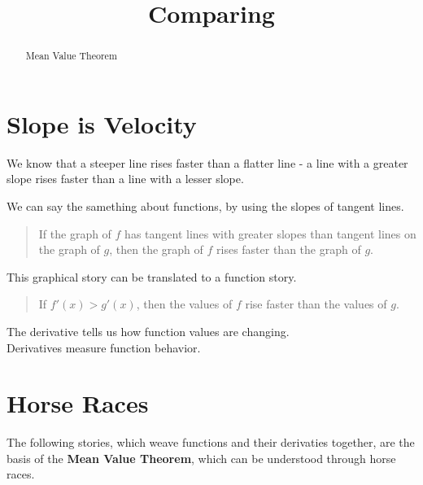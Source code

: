 \documentclass{ximera}
\title{Comparing}
\begin{document}
\begin{abstract}
Mean Value Theorem
\end{abstract}
\maketitle






\section{Slope is Velocity}



We know that a steeper line rises faster than a flatter line - a line with a greater slope rises faster than a line with a lesser slope. 


We can say the samething about functions, by using the slopes of tangent lines.


\begin{quote}

If the graph of $f$ has tangent lines with greater slopes than tangent lines on the graph of $g$, then the graph of $f$ rises faster than the graph of $g$.

\end{quote}


This graphical story can be translated to a function story.  


\begin{quote}

If $f'(x) > g'(x)$, then the values of $f$ rise faster than the values of $g$.

\end{quote}





The derivative tells us how function values are changing. \\

Derivatives measure function behavior. \\




\section{Horse Races}



The following stories, which weave functions and their derivaties together, are the basis of the \textbf{Mean Value Theorem}, which can be understood through horse races. \\
\end{document}
